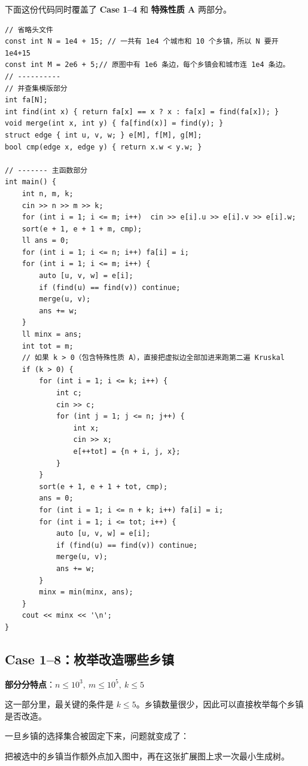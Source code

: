 \documentclass{book}
\begin{document}
下面这份代码同时覆盖了 \textbf{Case 1--4} 和 \textbf{特殊性质 A} 两部分。

\begin{lstlisting}[style = code]
// 省略头文件
const int N = 1e4 + 15; // 一共有 1e4 个城市和 10 个乡镇，所以 N 要开 1e4+15
const int M = 2e6 + 5;// 原图中有 1e6 条边，每个乡镇会和城市连 1e4 条边。
// ----------
// 并查集模版部分
int fa[N];
int find(int x) { return fa[x] == x ? x : fa[x] = find(fa[x]); }
void merge(int x, int y) { fa[find(x)] = find(y); }
struct edge { int u, v, w; } e[M], f[M], g[M];
bool cmp(edge x, edge y) { return x.w < y.w; }

// ------- 主函数部分
int main() {
    int n, m, k;
    cin >> n >> m >> k;
    for (int i = 1; i <= m; i++)  cin >> e[i].u >> e[i].v >> e[i].w;
    sort(e + 1, e + 1 + m, cmp);
    ll ans = 0;
    for (int i = 1; i <= n; i++) fa[i] = i;
    for (int i = 1; i <= m; i++) {
        auto [u, v, w] = e[i];
        if (find(u) == find(v)) continue;
        merge(u, v);
        ans += w;
    }
    ll minx = ans;
    int tot = m;
    // 如果 k > 0（包含特殊性质 A），直接把虚拟边全部加进来跑第二遍 Kruskal
    if (k > 0) {
        for (int i = 1; i <= k; i++) {
            int c;
            cin >> c;
            for (int j = 1; j <= n; j++) {
                int x;
                cin >> x;
                e[++tot] = {n + i, j, x};
            }
        }
        sort(e + 1, e + 1 + tot, cmp);
        ans = 0;
        for (int i = 1; i <= n + k; i++) fa[i] = i;
        for (int i = 1; i <= tot; i++) {
            auto [u, v, w] = e[i];
            if (find(u) == find(v)) continue;
            merge(u, v);
            ans += w;
        }
        minx = min(minx, ans);
    }
    cout << minx << '\n';
}
\end{lstlisting}

\newpage
\subsection{Case 1--8：枚举改造哪些乡镇}

\textbf{部分分特点}：$n \le 10^3,\ m \le 10^5,\ k \le 5$

这一部分里，最关键的条件是 $k \le 5$。乡镇数量很少，因此可以直接枚举每个乡镇是否改造。

一旦乡镇的选择集合被固定下来，问题就变成了：

\begin{center}
把被选中的乡镇当作额外点加入图中，再在这张扩展图上求一次最小生成树。
\end{center}
\end{document}
